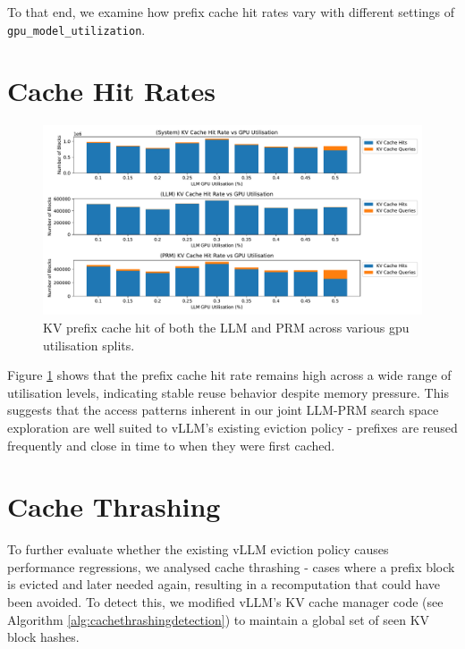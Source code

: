 \documentclass[12pt,twoside]{report}
\begin{document}
To that end, we examine how prefix cache hit rates vary with different settings of \texttt{gpu\_model\_utilization}.

\section{Cache Hit Rates}
\begin{figure}[htbp]
\centering
\includegraphics[width=\textwidth]{figures/kv_cache_hit_rate.pdf}
\caption{KV prefix cache hit of both the LLM and PRM across various gpu utilisation splits.}
\label{fig:kv_cache_hit_rate}
\end{figure}

Figure \ref{fig:kv_cache_hit_rate} shows that the prefix cache hit rate remains high across a wide range of utilisation levels, indicating stable reuse behavior despite memory pressure. 
This suggests that the access patterns inherent in our joint LLM-PRM search space exploration are well suited to vLLM's existing eviction policy - prefixes are reused frequently and close in time to when they were first cached.

\section{Cache Thrashing}
To further evaluate whether the existing vLLM eviction policy causes performance regressions, we analysed cache thrashing - cases where a prefix block is evicted and later needed again, resulting in a recomputation that could have been avoided. 
To detect this, we modified vLLM's KV cache manager code (see Algorithm \ref{alg:cachethrashingdetection}) to maintain a global set of seen KV block hashes. 
\end{document}
